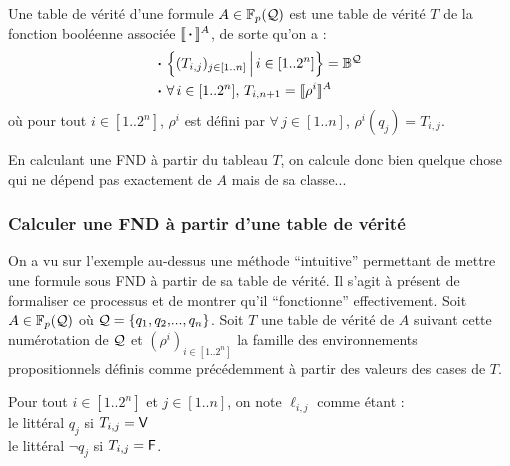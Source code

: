 			\eqskip{3mm}
			\begin{Definition}
				Une table de vérité d'une formule \(A \in \FpQ\) est une table de vérité \(T\) de la fonction booléenne associée \(\llbracket \text{\! \bdot \!} \rrbracket^A\), de sorte qu'on a :
					\begin{align*}
						\text{\bdot} & \!\left\{(T_{i,j})_{j \in [1..n]} \, \middle| \, i \in [1..2^n] \right\} = \bb{B}^\cal{Q} \\
						\text{\bdot} & \forall \, i \in [1..2^n], \, T_{i,n+1} = \llbracket \rho^i \rrbracket^A
					\end{align*}
				où pour tout \(i \in [1..2^n]\), \(\rho^i\) est défini par \(\forall \, j \in [1..n]\), \(\rho^i (q_j) = T_{i,j}\).
			\end{Definition}
			
			\begin{Remarque}
				En calculant une FND à partir du tableau \(T\), on calcule donc bien quelque chose qui ne dépend pas exactement de \(A\) mais de sa classe...
			\end{Remarque}
			
		\subsubsection{Calculer une FND à partir d'une table de vérité}
			
			On a vu sur l'exemple au-dessus une méthode ``intuitive'' permettant de mettre une formule sous FND à partir de sa table de vérité. Il s'agit à présent de formaliser ce processus et de montrer qu'il ``fonctionne'' effectivement. \nll
			Soit \(A \in \FpQ\) où \(\cal{Q} = \{q_1,q_2, \! ... ,q_n\}\).
			Soit \(T\) une table de vérité de \(A\) suivant cette numérotation de \(\cal{Q}\) et \((\rho^i)_{i \in [1..2^n]}\) la famille des environnements propositionnels définis comme précédemment à partir des valeurs des cases de \(T\).
			
			\begin{Notation}
			Pour tout \(i \in [1..2^n]\) et \(j \in [1..n]\), on note \(\ell_{i,j}\) comme étant : \\
			\hspace*{5mm} \bdot le littéral \(q_{j}\) si \(T_{i,j} = \V\) \\
			\hspace*{5mm} \bdot le littéral \( \neg q_j\) si \(T_{i,j} = \F\).
			\end{Notation}
			
